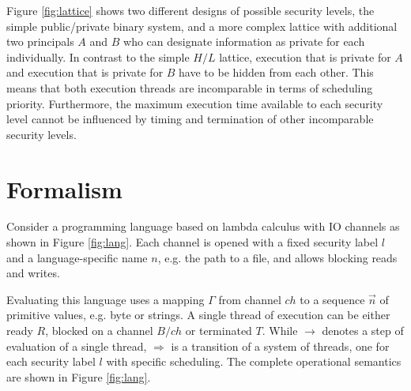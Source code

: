 \documentclass[10pt,preprint]{sigplanconf}
\begin{document}
Figure \ref{fig:lattice} shows two different designs of possible security levels, the simple public/private binary system, and a more complex lattice with additional two principals $A$ and $B$ who can designate information as private for each individually.  In contrast to the simple $H/L$ lattice, execution that is private for $A$ and execution that is private for $B$ have to be hidden from each other.  This means that both execution threads are incomparable in terms of scheduling priority.  Furthermore, the maximum execution time available to each security level cannot be influenced by timing and termination of other incomparable security levels.

\section{Formalism}

Consider a programming language based on lambda calculus with IO channels as shown in Figure \ref{fig:lang}.  Each channel is opened with a fixed security label $l$ and a language-specific name $n$, e.g. the path to a file, and allows blocking reads and writes.

Evaluating this language uses a mapping $\Gamma$ from channel $ch$ to a sequence $\vec{n}$ of primitive values, e.g. byte or strings.  A single thread of execution can be either ready $R$, blocked on a channel $B/ch$ or terminated $T$.  While $\rightarrow$ denotes a step of evaluation of a single thread, $\Rightarrow$ is a transition of a system of threads, one for each security label $l$ with specific scheduling.  The complete operational semantics are shown in Figure \ref{fig:lang}.
\end{document}
